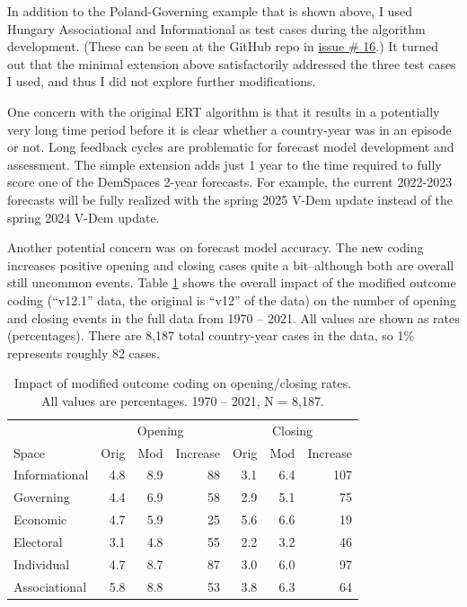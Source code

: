 \documentclass[
  11pt,
]{article}
\begin{document}
In addition to the Poland-Governing example that is shown above, I used
Hungary Associational and Informational as test cases during the
algorithm development. (These can be seen at the GitHub repo in
\href{https://github.com/vdeminstitute/demspaces/issues/16}{issue \# 16}.)
It turned out that the minimal extension above satisfactorily addressed
the three test cases I used, and thus I did not explore further
modifications.

One concern with the original ERT algorithm is that it results in a
potentially very long time period before it is clear whether a
country-year was in an episode or not. Long feedback cycles are
problematic for forecast model development and assessment. The simple
extension adds just 1 year to the time required to fully score one of
the DemSpaces 2-year forecasts. For example, the current 2022-2023
forecasts will be fully realized with the spring 2025 V-Dem update
instead of the spring 2024 V-Dem update.

Another potential concern was on forecast model accuracy. The new coding
increases positive opening and closing cases quite a bit--although both
are overall still uncommon events. Table \ref{tab:positive-rates} shows
the overall impact of the modified outcome coding (``v12.1'' data, the
original is ``v12'' of the data) on the number of opening and closing
events in the full data from 1970 -- 2021. All values are shown as rates
(percentages). There are 8,187 total country-year cases in the data, so
1\% represents roughly 82 cases.

\begin{table}
\centering
\caption{Impact of modified outcome coding on opening/closing rates. All values are percentages. 1970 – 2021, N = 8,187.\label{tab:positive-rates}}
\begin{tabular}[t]{lrrrrrr}
\toprule
\multicolumn{1}{c}{} & \multicolumn{3}{c}{Opening} & \multicolumn{3}{c}{Closing} \\
\cmidrule(l{3pt}r{3pt}){2-4} \cmidrule(l{3pt}r{3pt}){5-7}
Space & Orig & Mod & Increase & Orig & Mod & Increase\\
\midrule
Informational & 4.8 & 8.9 & 88 & 3.1 & 6.4 & 107\\
Governing & 4.4 & 6.9 & 58 & 2.9 & 5.1 & 75\\
Economic & 4.7 & 5.9 & 25 & 5.6 & 6.6 & 19\\
Electoral & 3.1 & 4.8 & 55 & 2.2 & 3.2 & 46\\
Individual & 4.7 & 8.7 & 87 & 3.0 & 6.0 & 97\\
Associational & 5.8 & 8.8 & 53 & 3.8 & 6.3 & 64\\
\bottomrule
\end{tabular}
\end{table}
\end{document}
